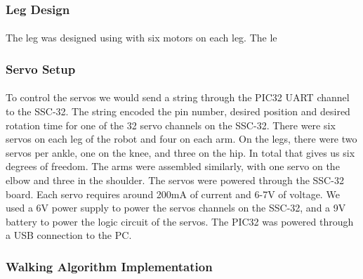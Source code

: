 \documentclass[letterpaper,12pt]{article}
\begin{document}
\subsubsection{Leg Design}
\paragraph{}The leg was designed using with six motors on each leg. The le

\subsubsection{Servo Setup}
\paragraph{} To control the servos we would send a string through the PIC32 UART
channel to the SSC-32. The string encoded the pin number, desired position and
desired rotation time for one of the 32 servo channels on the
SSC-32\cite{sscdata}. There were six servos on each leg of the robot and four on
each arm. On the legs, there were two servos per ankle, one on the knee, and
three on the hip. In total that gives us six degrees of freedom.  The arms were
assembled similarly, with one servo on the elbow and three in the shoulder. The
servos were powered through the SSC-32 board. Each servo requires around 200mA
of current and 6-7V of voltage\cite{servodata}. We used a 6V power supply to
power the servos channels on the SSC-32, and a 9V battery to power the logic
circuit of the servos. The PIC32 was powered through a USB connection to the PC.

\subsubsection{Walking Algorithm Implementation}
\end{document}
